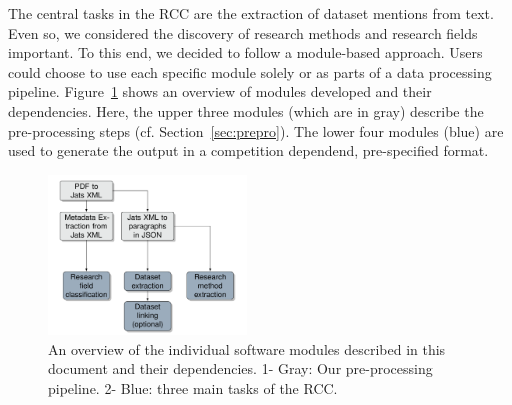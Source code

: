 




The central tasks in the RCC are the extraction of dataset mentions from text. 
Even so, we considered the discovery of research methods and research fields important.
To this end, we decided to follow a module-based approach. Users could choose to use each specific module solely or as parts of a data processing pipeline.
Figure~\ref{figure:pipeline} shows an overview of modules developed and their dependencies.
Here, the upper three modules (which are in gray) describe the pre-processing steps (cf. Section~\ref{sec:prepro}).
The lower four modules (blue) are used to generate the output in a competition dependend, pre-specified format. 

\begin{figure}[t]
    \includegraphics[width=0.47\textwidth]{figures/information-flow.png}
    \caption{An overview of the individual software modules described in this document and their dependencies. 1- Gray: Our pre-processing pipeline. 2- Blue: three main tasks of the RCC.}
    \label{figure:pipeline}
\end{figure}

